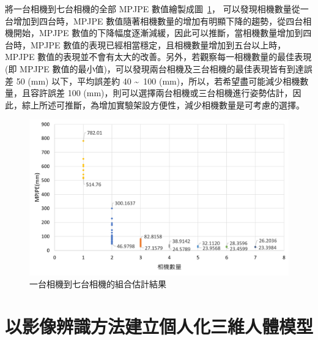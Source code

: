 將一台相機到七台相機的全部 MPJPE 數值繪製成圖~\ref{ch3_fig_1to7cam}，
可以發現相機數量從一台增加到四台時，MPJPE 數值隨著相機數量的增加有明顯下降的趨勢，從四台相機開始，MPJPE 數值的下降幅度逐漸減緩，因此可以推斷，當相機數量增加到四台時，MPJPE 數值的表現已經相當穩定，且相機數量增加到五台以上時，MPJPE 數值的表現並不會有太大的改善。另外，若觀察每一相機數量的最佳表現 (即 MPJPE 數值的最小值)，可以發現兩台相機及三台相機的最佳表現皆有到達誤差 50 (mm) 以下，平均誤差約 40 \textasciitilde\ 100 (mm)，所以，若希望盡可能減少相機數量，且容許誤差 100 (mm)，則可以選擇兩台相機或三台相機進行姿勢估計，因此，綜上所述可推斷，為增加實驗架設方便性，減少相機數量是可考慮的選擇。
\begin{figure}[!ht]
   \centering
   \includegraphics[width=13cm]{figure/ch3_fig_1to7cam.png}
   \caption[一台相機到七台相機的組合估計結果]{一台相機到七台相機的組合估計結果}
   \label{ch3_fig_1to7cam}
\end{figure}

\clearpage

\section{以影像辨識方法建立個人化三維人體模型}\label{ch4_skeleton_exp}

